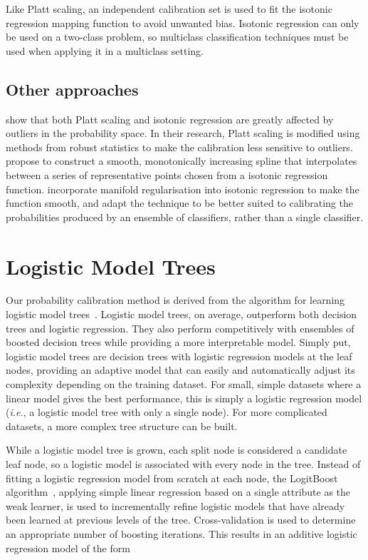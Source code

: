 \documentclass[wcp]{jmlr}
\begin{document}
Like Platt scaling, an independent calibration set is used to fit the isotonic regression mapping function to avoid unwanted bias. Isotonic regression can only be used on a two-class problem, so multiclass classification techniques must be used when applying it in a multiclass setting.

\subsection{\label{sec:other_probability_calibration_methods}Other approaches}
\cite{ruping2006robust} show that both Platt scaling and isotonic regression are greatly affected by outliers in the probability space. In their research, Platt scaling is modified using methods from robust statistics to make the calibration less sensitive to outliers. \cite{jiang2011smooth} propose to construct a smooth, monotonically increasing spline that interpolates between a series of representative points chosen from a isotonic regression function. \cite{zhong2013accurate} incorporate manifold regularisation into isotonic regression to make the function smooth, and adapt the technique to be better suited to calibrating the probabilities produced by an ensemble of classifiers, rather than a single classifier. 

\section{\label{sec:logistic_model_trees}Logistic Model Trees}
Our probability calibration method is derived from the algorithm for learning logistic model trees~\citep{landwehr2005logistic}. Logistic model trees, on average, outperform both decision trees and logistic regression. They also perform competitively with ensembles of boosted decision trees while providing a more interpretable model. Simply put, logistic model trees are decision trees with logistic regression models at the leaf nodes, providing an adaptive model that can easily and automatically adjust its complexity depending on the training dataset. For small, simple datasets where a linear model gives the best performance, this is simply a logistic regression model (\textit{i.e.}, a logistic model tree with only a single node). For more complicated datasets, a more complex tree structure can be built.

While a logistic model tree is grown, each split node is considered a candidate leaf node, so a logistic model is associated with every node in the tree. Instead of fitting a logistic regression model from scratch at each node, the LogitBoost algorithm~\citep{friedman2000additive}, applying simple linear regression based on a single attribute as the weak learner, is used to incrementally refine logistic models that have already been learned at previous levels of the tree. Cross-validation is used to determine an appropriate number of boosting iterations. This results in an additive logistic regression model of the form
\end{document}
